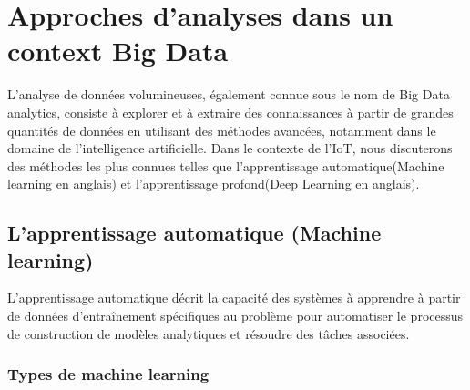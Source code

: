 \documentclass{report}
\begin{document}
\section{Approches d'analyses dans un context Big Data}
L'analyse de données volumineuses, également connue sous le nom de Big Data analytics, consiste à explorer et à extraire des connaissances à partir de grandes quantités de données en utilisant des méthodes avancées, notamment dans le domaine de l'intelligence artificielle. Dans le contexte de l'IoT, nous discuterons des méthodes les plus connues telles que l'apprentissage automatique(Machine learning en anglais) et l'apprentissage profond(Deep Learning en anglais).

\subsection{L'apprentissage automatique (Machine learning)}
  L'apprentissage automatique décrit la capacité des systèmes à apprendre à partir de données d'entraînement spécifiques au problème pour automatiser le processus de construction de modèles analytiques et résoudre des tâches associées. \cite{[Christian Janiesch and al,2021]}
  \subsubsection{Types de machine learning}
  
\end{document}

